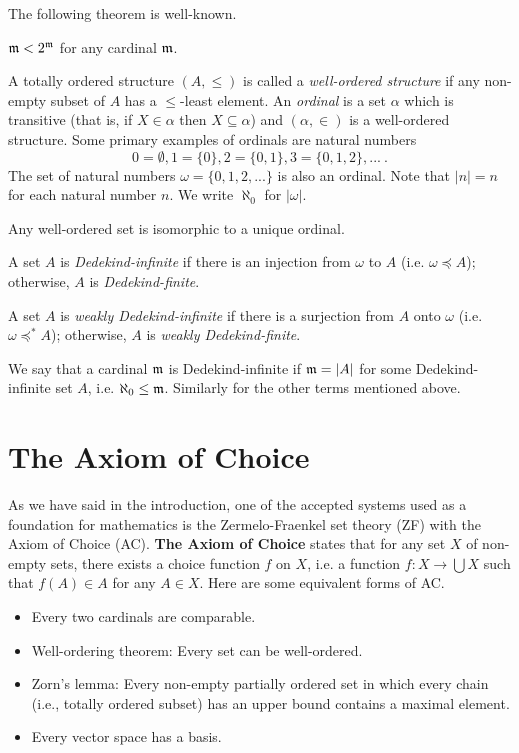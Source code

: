 \noindent The following theorem is well-known.

\begin{theorem}[Cantor] $\frak{m}<2^{\frak{m}}$ for any cardinal $\frak{m}$.
\end{theorem}

   
A totally ordered structure $(A,\leq)$ is called a \emph{well-ordered structure} if any non-empty subset of $A$ has a $\leq$-least element. An \emph{ordinal} is a set $\alpha$ which is transitive (that is, if $X\in\alpha$ then $X\subseteq\alpha$) and $(\alpha,\in)$ is a well-ordered structure. Some primary examples of ordinals are natural numbers $$0=\emptyset, 1=\{0\}, 2=\{0,1\}, 3=\{0,1,2\}, ... \ .$$ The set of natural numbers $\omega=\{0,1,2,...\}$ is also an ordinal. Note that $|n|=n$ for each natural number $n$. We write $\aleph_{0}$ for $|\omega|$. 

\begin{theorem}
    Any well-ordered set is isomorphic to a unique ordinal.
\end{theorem}

\begin{definition}\textup{
A set $A$ is \emph{Dedekind-infinite} if there is an injection from $\omega$ to $A$ (i.e. $\omega \preceq A$); otherwise, $A$ is \emph{Dedekind-finite}.
}
  \end{definition}

\begin{definition}
    \textup{A set $A$ is \emph{weakly Dedekind-infinite} if there is a surjection from $A$ onto $\omega$ (i.e. $\omega \preceq^{*} A$); otherwise, $A$ is \emph{weakly Dedekind-finite}.}
\end{definition}

We say that a cardinal $\frak{m}$ is Dedekind-infinite if $\frak{m}=|A|$ for some Dedekind-infinite set $A$, i.e. $\aleph_{0}\leq\frak{m}$. Similarly for the other terms mentioned above.


\section{The Axiom of Choice}

As we have said in the introduction, one of the accepted systems used as a foundation for mathematics is the Zermelo-Fraenkel set theory (ZF) with the Axiom of Choice (AC). \textbf{The Axiom of Choice} states that for any set $X$ of non-empty sets, there exists a choice function $f$ on $X$, i.e. a function $f:X\to\bigcup X$ such that $f(A)\in A$ for any $A\in X$. Here are some equivalent forms of AC. 
    \begin{itemize}\itemsep0em
        \item[1.] Every two cardinals are comparable.
        \item[2.] Well-ordering theorem: Every set can be well-ordered.
        \item[3.] Zorn's lemma: Every non-empty partially ordered set in which every chain (i.e., totally ordered subset) has an upper bound contains a maximal element.
        \item[4.] Every vector space has a basis.
        \end{itemize}

